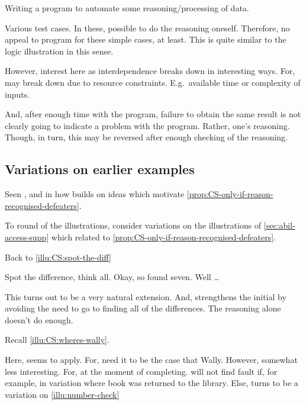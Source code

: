 \begin{note}[Programming]
  \begin{illustration}
    \label{illu:programming}
    Writing a program to automate some reasoning/processing of data.
  \end{illustration}
  Various test cases.
  In these, possible to do the reasoning oneself.
  Therefore, no appeal to program for these simple cases, at least.
  This is quite similar to the logic illustration in this sense.

  However, interest here as interdependence breaks down in interesting ways.
  For, may break down due to resource constraints.
  E.g.\ available time or complexity of inputs.

  And, after enough time with the program, failure to obtain the same result is not clearly going to indicate a problem with the program.
  Rather, one's reasoning.
  Though, in turn, this may be reversed after enough checking of the reasoning.
\end{note}

\subsection{Variations on earlier examples}

\begin{note}
  Seen \nI{}, and in how builds on ideas which motivate \autoref{prop:CS-only-if-reason-recognised-defeaters}.

  To round of the illustrations, consider variations on the illustrations of \ref{sec:abil-access-supp} which related to \autoref{prop:CS-only-if-reason-recognised-defeaters}.
\end{note}

\begin{note}
  Back to \autoref{illu:CS:spot-the-diff}

  Spot the difference, think all.
  Okay, so found seven.
  Well \dots

  This turns out to be a very natural extension.
  And, strengthens the initial by avoiding the need to go to finding all of the differences.
  The reasoning alone doesn't do enough.
\end{note}

\begin{note}[Wally]
  Recall \autoref{illu:CS:wheres-wally}.

  Here, seems to apply.
  For, need it to be the case that Wally.
  However, somewhat less interesting.
  For, at the moment of completing.
  \nI{} will not find fault if, for example, in variation where book was returned to the library.
  Else, turns to be a variation on \autoref{illu:number-check}
\end{note}

